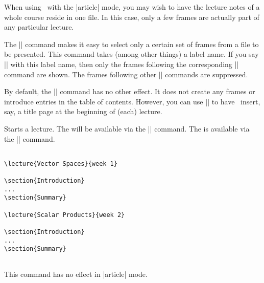 When using \beamer\ with the |article| mode, you may wish to have the lecture notes of a whole course reside in one file. In this case, only a few frames are actually part of any particular lecture.

The |\lecture| command makes it easy to select only a certain set of frames from a file to be presented. This command takes (among other things) a label name. If you say || with this label name, then only the frames following the corresponding |\lecture| command are shown. The frames following other |\lecture| commands are suppressed.

By default, the |\lecture| command has no other effect. It does not create any frames or introduce entries in the table of contents. However, you can use |\AtBeginLecture| to have \beamer\ insert, say, a title page at the beginning of (each) lecture.

\begin{command}{\lecture{}}
  Starts a lecture. The  will be available via the |\insertlecture| command. The  is available via the |\insertshortlecture| command.

  \example
\begin{verbatim}

\lecture{Vector Spaces}{week 1}

\section{Introduction}
...
\section{Summary}

\lecture{Scalar Products}{week 2}

\section{Introduction}
...
\section{Summary}


\end{verbatim}

  \articlenote
  This command has no effect in |article| mode.
\end{command}

